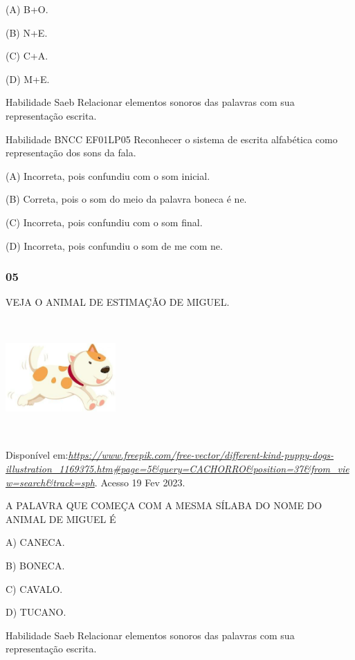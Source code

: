 \begin{escola}
(A) B+O.

(B) N+E.

(C) C+A.

(D) M+E.

Habilidade Saeb Relacionar elementos sonoros das palavras com sua
representação escrita.

Habilidade BNCC EF01LP05 Reconhecer o sistema de escrita alfabética como
representação dos sons da fala.

(A) Incorreta, pois confundiu com o som inicial.

(B) Correta, pois o som do meio da palavra boneca é ne.

(C) Incorreta, pois confundiu com o som final.

(D) Incorreta, pois confundiu o som de me com
ne.\protect\hypertarget{_heading=h.1meprgjlpdif}{}{}

\subsubsection{05}\label{section-45}

VEJA O ANIMAL DE ESTIMAÇÃO DE MIGUEL.

\includegraphics[width=1.65208in,height=1.75972in]{media/image214.jpg}

Disponível
em:\href{https://www.freepik.com/free-vector/different-kind-puppy-dogs-illustration_1169375.htm\#page=5\&query=CACHORRO\&position=37\&from_view=search\&track=sph}{\emph{https://www.freepik.com/free-vector/different-kind-puppy-dogs-illustration\_1169375.htm\#page=5\&query=CACHORRO\&position=37\&from\_view=search\&track=sph}}.
Acesso 19 Fev 2023.

A PALAVRA QUE COMEÇA COM A MESMA SÍLABA DO NOME DO ANIMAL DE MIGUEL É

A) CANECA.

B) BONECA.

C) CAVALO.

D) TUCANO.

Habilidade Saeb Relacionar elementos sonoros das palavras com sua
representação escrita.


\end{escola}
